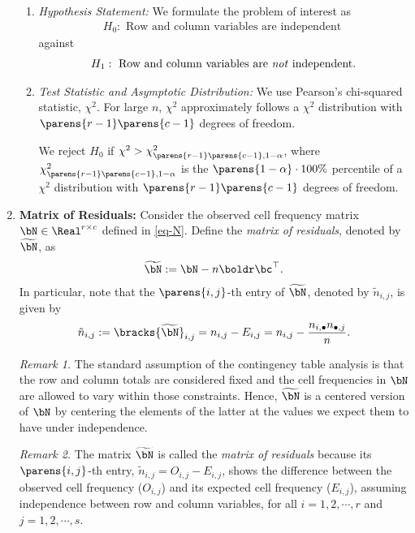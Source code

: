 \documentclass[12pt]{article}
\begin{document}
\begin{enumerate}[label=\textbf{\arabic*.}]
\begin{enumerate}
		\item \textit{Hypothesis Statement:} We formulate the problem of interest as 
		\begin{align*}
			H_0: \text{ Row and column variables are independent }
		\end{align*}
		against 
		\begin{align*}
			H_1: \text{ Row and column variables are \emph{not} independent}. 
		\end{align*}

		\item \textit{Test Statistic and Asymptotic Distribution:} We use Pearson's chi-squared statistic, $\chi^2$. For large $n$, $\chi^2$ approximately follows a $\chi^2$ distribution with $\parens{r-1} \parens{c-1}$ degrees of freedom. 
		
		We reject $H_0$ if $\chi^2 > \chi^2_{\parens{r-1} \parens{c-1}, 1-\alpha}$, where $\chi^2_{\parens{r-1} \parens{c-1}, 1-\alpha}$ is the $\parens{ 1- \alpha}\cdot 100\%$ percentile of a $\chi^2$ distribution with $\parens{r-1} \parens{c-1}$ degrees of freedom. 
		
	\end{enumerate}
	
	\item \textbf{Matrix of Residuals:} Consider the observed cell frequency matrix $\bN \in \Real^{r \times c}$ defined in \eqref{eq-N}. Define the \emph{matrix of residuals}, denoted by $\widetilde{\bN}$, as 
	\begin{align*}
		\widetilde{\bN} := \bN - n \boldr \bc^\top. 
	\end{align*}
	In particular, note that the $\parens{i, j}$-th entry of $\widetilde{\bN}$, denoted by $\tilde{n}_{i,j}$, is given by 
	\begin{align*}
		\tilde{n}_{i,j} := \bracks{\widetilde{\bN}}_{i,j} = n_{i,j} - E_{i,j} = n_{i,j} - \frac{n_{i,\bullet} n_{\bullet,j}}{n}. 
	\end{align*}
	
	\textit{Remark 1.} The standard assumption of the contingency table analysis is that the row and column totals are considered fixed and the cell frequencies in $\bN$ are allowed to vary within those constraints. Hence, $\widetilde{\bN}$ is a centered version of $\bN$ by centering the elements of the latter at the values we expect them to have under independence. 
	
	\textit{Remark 2.} The matrix $\widetilde{\bN}$ is called the \emph{matrix of residuals} because its $\parens{i, j}$-th entry, $\tilde{n}_{i,j} = O_{i,j} - E_{i,j}$, shows the difference between the observed cell frequency ($O_{i,j}$) and its expected cell frequency ($E_{i,j}$), assuming independence between row and column variables, for all $i = 1, 2, \cdots, r$ and $j = 1, 2, \cdots, s$. 
	

\end{enumerate}
\end{document}
